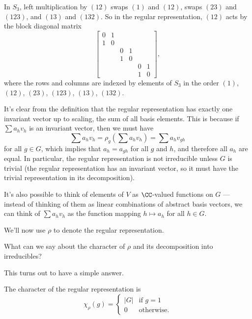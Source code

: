 \begin{example}
    In $S_3$, left multiplication by $(12)$ swaps $(1)$ and $(12)$, swaps $(23)$ and $(123)$, and $(13)$ and $(132)$. So in the regular representation, $(12)$ acts by the block diagonal matrix \[\begin{bmatrix} 0 & 1 & & & & \\ 1 & 0 & & & & \\ & & 0 & 1 & & \\ & & 1 & 0 & & \\ & & & & 0 & 1 \\ & & & & 1 & 0 \end{bmatrix},\] where the rows and columns are indexed by elements of $S_3$ in the order $(1)$, $(12)$, $(23)$, $(123)$, $(13)$, $(132)$.
\end{example}

It's clear from the definition that the regular representation has exactly one invariant vector up to scaling, the sum of all basis elements. This is because if $\sum a_hv_h$ is an invariant vector, then we must have \[\sum a_hv_h = \rho_g\left(\sum a_hv_h\right) = \sum a_hv_{gh}\] for all $g \in G$, which implies that $a_h = a_{gh}$ for all $g$ and $h$, and therefore all $a_h$ are equal. In particular, the regular representation is not irreducible unless $G$ is trivial (the regular representation has an invariant vector, so it must have the trivial representation in its decomposition). 

\begin{note}
It's also possible to think of elements of $V$ as $\CC$-valued functions on $G$ --- instead of thinking of them as linear combinations of abstract basis vectors, we can think of $\sum a_hv_h$ as the function mapping $h \mapsto a_h$ for all $h \in G$. 
\end{note}

We'll now use $\rho$ to denote the regular representation. 

\begin{qq}
What can we say about the character of $\rho$ and its decomposition into irreducibles?
\end{qq}

This turns out to have a simple answer. 

\begin{proposition}
    The character of the regular representation is \[\chi_\rho(g) = \begin{cases} |G| & \text{if } g = 1 \\ 0 & \text{otherwise}.\end{cases}\] 
\end{proposition}

